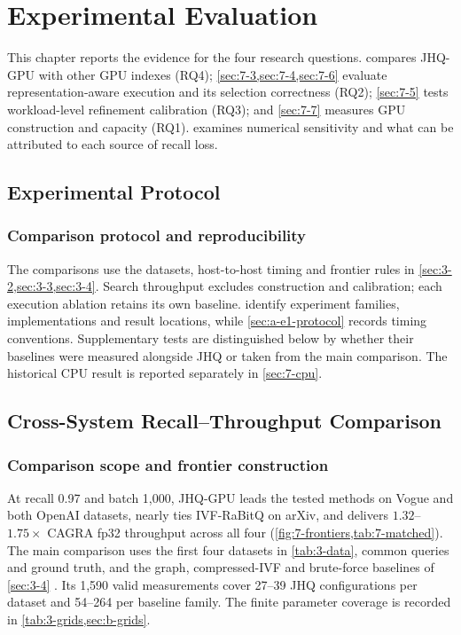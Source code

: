 \chapter{Experimental Evaluation}
\label{ch:evaluation}

This chapter reports the evidence for the four research questions.
 compares JHQ-GPU with other GPU indexes (RQ4);
\cref{sec:7-3,sec:7-4,sec:7-6} evaluate representation-aware execution
and its selection correctness (RQ2); \cref{sec:7-5} tests workload-level
refinement calibration (RQ3); and \cref{sec:7-7} measures GPU construction
and capacity (RQ1).  examines numerical sensitivity and
what can be attributed to each source of recall loss.

\section{Experimental Protocol}
\label{sec:7-1}

\subsection{Comparison protocol and reproducibility}

The comparisons use the datasets, host-to-host timing and frontier rules
in \cref{sec:3-2,sec:3-3,sec:3-4}. Search throughput excludes construction
and calibration; each execution ablation retains its own baseline.
 identify experiment families,
implementations and result locations, while \cref{sec:a-e1-protocol}
records timing conventions. Supplementary tests are distinguished below
by whether their baselines were measured alongside JHQ or taken from
the main comparison. The historical CPU result is reported separately
in \cref{sec:7-cpu}.

\section{Cross-System Recall--Throughput Comparison}
\label{sec:7-2}

\subsection{Comparison scope and frontier construction}

At recall 0.97 and batch 1,000, JHQ-GPU leads the tested methods on
Vogue and both OpenAI datasets, nearly ties IVF-RaBitQ on arXiv, and
delivers $1.32$--$1.75\times$ CAGRA fp32 throughput across all four
(\cref{fig:7-frontiers,tab:7-matched}). The main comparison uses the first four datasets in
\cref{tab:3-data}, common queries and ground truth, and the graph,
compressed-IVF and brute-force baselines of \cref{sec:3-4}
\cite{cagra,pq,ivfrabitq}. Its 1,590 valid measurements cover 27--39 JHQ
configurations per dataset and 54--264 per baseline family. The finite
parameter coverage is recorded in \cref{tab:3-grids,sec:b-grids}.

